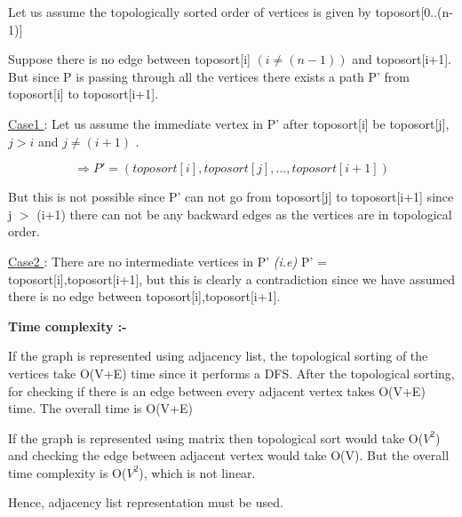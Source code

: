 \documentclass[12pt]{article}
\begin{document}
\begin{enumerate}
    Let us assume the topologically sorted order of vertices is given by toposort[0..(n-1)]
    
    Suppose there is no edge between toposort[i] $(i\neq(n-1))$ and toposort[i+1]. But since P is passing through all the vertices there exists a path P' from toposort[i] to toposort[i+1]. 
    
    \underline{Case1 }:
    Let us assume the immediate vertex in P' after toposort[i] be toposort[j], $j>i$ and $j\neq(i+1)$ . 
    
    \[ \Rightarrow P' = ( toposort[i],toposort[j],...,toposort[i+1] )  \]
    
    But this is not possible since P' can not go from toposort[j] to toposort[i+1] since j $>$ (i+1) there can not be any backward edges as the vertices are in topological order.
    
    \underline{Case2 }:
    There are no intermediate vertices in P' \textit{(i.e)} P' = {toposort[i],toposort[i+1]}, but this is clearly a contradiction since we have assumed there is no edge between toposort[i],toposort[i+1].
    
    \textbf{Time complexity :-}
    
    If the graph is represented using adjacency list, the topological sorting of the vertices take O(V+E) time since it performs a DFS. After the topological sorting, for checking if there is an edge between every adjacent vertex takes O(V+E) time. The overall time is O(V+E)
    
    If the graph is represented using matrix then topological sort would take O($V^2$) and checking the edge between adjacent vertex would take O(V). But the overall time complexity is O($V^2$), which is not linear. 
    
    Hence, adjacency list representation must be used. 
    

\end{enumerate}
\end{document}
